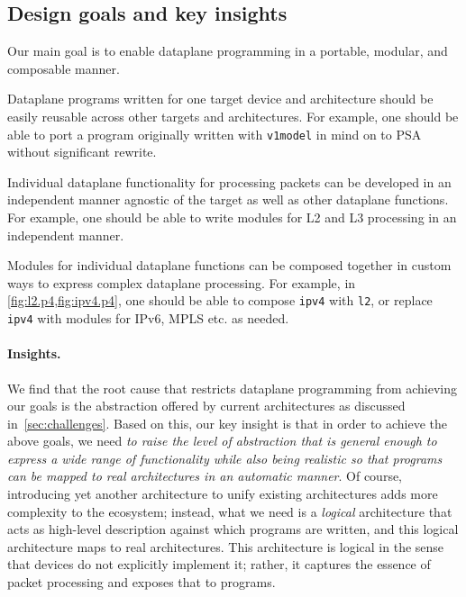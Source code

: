 \documentclass[letterpaper,twocolumn,10pt]{article}
\begin{document}
\subsection{Design goals and key insights}
\label{sec:goals}
\label{sec:insights}

Our main goal is to enable dataplane programming in a portable,
modular, and composable manner.

 Dataplane programs written for one target device
and architecture should be easily reusable across other targets and
architectures. For example, one should be able to port a program
originally written with \texttt{v1model} in mind on to PSA without
significant rewrite.

 Individual dataplane functionality for processing
packets can be developed in an independent manner agnostic of the
target as well as other dataplane functions. For example, one should
be able to write modules for L2 and L3 processing in an independent
manner.

 Modules for individual dataplane functions can
be composed together in custom ways to express complex dataplane
processing. For example, in \cref{fig:l2.p4,fig:ipv4.p4}, one should
be able to compose \texttt{ipv4} with \texttt{l2}, or replace
\texttt{ipv4} with modules for IPv6, MPLS etc. as needed.





\paragraph{Insights.}
We find that the root cause that restricts dataplane programming from
achieving our goals is the abstraction offered by current
architectures as discussed in~\cref{sec:challenges}. Based on this,
our key insight is that in order to achieve the above goals, we need
\emph{to raise the level of abstraction that is general enough to
  express a wide range of functionality while also being realistic so
  that programs can be mapped to real architectures in an automatic
manner}. Of course, introducing yet another architecture to unify
existing architectures adds more complexity to the ecosystem; instead,
what we need is a \emph{logical} architecture that acts as high-level
description against which programs are written, and this logical
architecture maps to real architectures. This architecture is logical
in the sense that devices do not explicitly implement it; rather, it
captures the essence of packet processing and exposes that to
programs.
\end{document}
